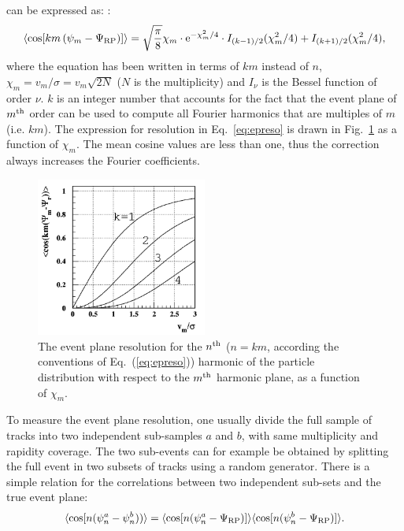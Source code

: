 can be expressed as:
\cite{Poskanzer:1998yz}:
\begin{equation}
\label{eq:epreso}
\left\langle \cos [km\left( \psi_m-\Psi_{\rm RP}\right)]\right\rangle = \sqrt{\dfrac{\pi }{8}} \chi_m \cdot {\rm e}^{-\chi_m^2/4} \cdot I_{(k-1)/2}(\chi_m^2/4)+I_{(k+1)/2}(\chi_m^2/4),
\end{equation}
where the equation has been written in terms of $km$ 
instead of $n$, $\chi_m= v_m/\sigma = v_m\sqrt{2N}$ ($N$ is the multiplicity) and 
$I_\nu$ is the Bessel function of order $\nu$.
$k$ is an integer number that accounts for the fact that the 
event plane of $m^{\rm th}$ order can be used to compute all Fourier harmonics that are multiples
of $m$ (i.e. $km$). The expression for resolution in Eq.~\ref{eq:epreso} is
drawn in Fig.~\ref{fig:resoBessel} as a function of $\chi_m$. 
The mean cosine values are less than one, thus the 
correction always increases the Fourier coefficients.
\begin{figure}
\centering
 \includegraphics[width=0.5\textwidth]{FigCap5/resolBessel.png}
 \caption[Event plane resolution vs $\chi_m$]{The event plane resolution for the $n^{\rm th}$ ($n=km$, according the conventions of Eq.~(\ref{eq:epreso})) harmonic of the particle distribution with respect to the $m^{\rm th}$ harmonic plane, as a function of $\chi_m$.}
 \label{fig:resoBessel}
\end{figure}
To measure the event plane resolution, one usually divide the
full sample of tracks into two independent sub-samples 
$a$ and $b$, with same multiplicity and rapidity coverage.
The two sub-events can for example be obtained by 
splitting the full event in two subsets of tracks using a random generator.
There is a simple relation for the correlations between 
two independent sub-sets and the true event plane:
\begin{equation}
\langle {\rm cos} [n({\rm \psi}^a_n-{\rm \psi}^b_n)) \rangle = 
\langle {\rm cos} [n({\rm \psi}^a_n-{\rm \Psi}_{\rm RP})] \rangle \langle {\rm cos} [n({\rm \psi}^b_n-{\rm \Psi}_{\rm RP})] \rangle .
\end{equation}
